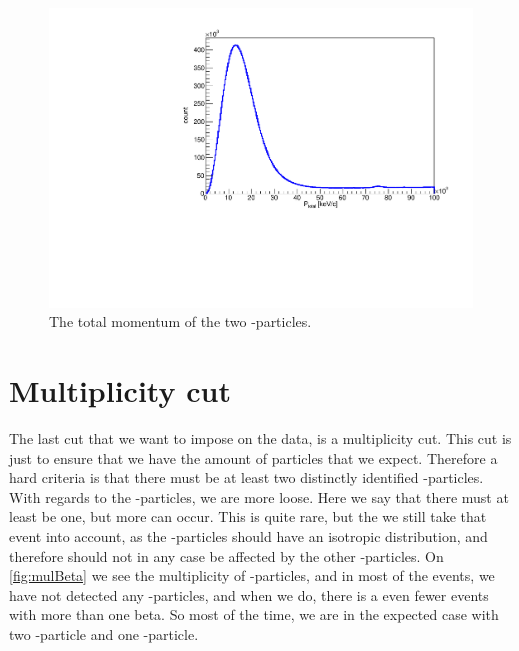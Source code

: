 \begin{figure}[h]
	\centering
	\includegraphics[width=\linewidth]{../figures/ptotNoCut.pdf}
	\caption{The total momentum of the two \al-particles.}
	\label{fig:totalMomentum}
\end{figure}

\section{Multiplicity cut}
The last cut that we want to impose on the data, is a multiplicity cut. This cut is just to ensure that we have the amount of particles that we expect. 
Therefore a hard criteria is that there must be at least two distinctly identified \al-particles. \\

With regards to the \be-particles, we are more loose. Here we say that there must at least be one, but more can occur. This is quite rare, but the we still take that event into account, as the \be-particles should have an isotropic distribution, and therefore should not in any case be affected by the other \al-particles. On \cref{fig:mulBeta} we see the multiplicity of \be-particles, and in most of the events, we have not detected any \be-particles, and when we do, there is a even fewer events with more than one beta. So most of the time, we are in the expected case with two \al-particle and one \be-particle. 

